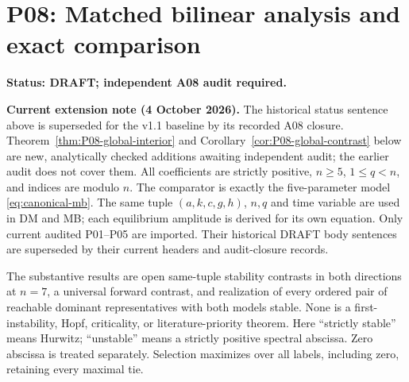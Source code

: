 \section{P08: Matched bilinear analysis and exact comparison}
\label{sec:P08}
\noindent\textbf{Status: DRAFT; independent A08 audit required.}
\par\noindent\textbf{Current extension note (4 October 2026).}
The historical status sentence above is superseded for the v1.1 baseline
by its recorded A08 closure. Theorem~\ref{thm:P08-global-interior} and
Corollary~\ref{cor:P08-global-contrast} below are new, analytically checked
additions awaiting independent audit; the earlier audit does not cover them.
All coefficients are strictly positive, $n\ge5$, $1\le q<n$, and indices
are modulo $n$. The comparator is exactly the five-parameter model
\eqref{eq:canonical-mb}. The same tuple $(a,k,c,g,h)$, $n,q$ and time
variable are used in DM and MB; each equilibrium amplitude is derived
for its own equation. Only current audited P01--P05 are imported.
Their historical DRAFT body sentences are superseded by their current
headers and audit-closure records.

The substantive results are open same-tuple stability contrasts in both
directions at $n=7$, a universal forward contrast, and realization of
every ordered pair of reachable dominant representatives with both
models stable. None is a first-instability, Hopf, criticality, or
literature-priority theorem. Here ``strictly stable'' means Hurwitz;
``unstable'' means a strictly positive spectral abscissa. Zero abscissa
is treated separately. Selection maximizes over all labels, including
zero, retaining every maximal tie.

